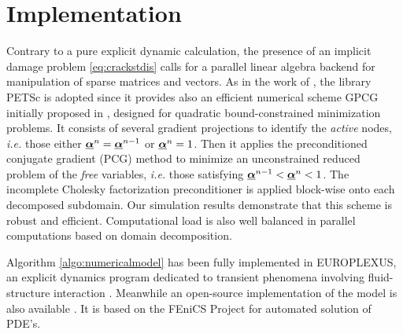 \section{Implementation}
Contrary to a pure explicit dynamic calculation, the presence of an implicit damage problem \eqref{eq:crackstdis} calls for a parallel linear algebra backend for manipulation of sparse matrices and vectors. As in the work of \cite{MesgarnejadBourdinKhonsari:2014}, the library PETSc \cite{PETSc:2015} is adopted since it provides also an efficient numerical scheme GPCG initially proposed in \cite{MoreToraldo:1991}, designed for quadratic bound-constrained minimization problems. It consists of several gradient projections to identify the \emph{active} nodes, \emph{i.e.} those either $\dvec^n=\dvec^{n-1}$ or $\dvec^n=1$. Then it applies the preconditioned conjugate gradient (PCG) method to minimize an unconstrained reduced problem of the \emph{free} variables, \emph{i.e.} those satisfying $\dvec^{n-1}<\dvec^n<1$. The incomplete Cholesky factorization preconditioner is applied block-wise onto each decomposed subdomain. Our simulation results demonstrate that this scheme is robust and efficient. Computational load is also well balanced \cite{BensonMcInnesMore:2001} in parallel computations based on domain decomposition.

Algorithm \ref{algo:numericalmodel} has been fully implemented in EUROPLEXUS, an explicit dynamics program dedicated to transient phenomena involving fluid-structure interaction \cite{EPX:2015}. Meanwhile an open-source implementation of the model is also available \cite{LiMaurini:2015}. It is based on the FEniCS Project \cite{LoggMardalWells:2012} for automated solution of PDE's.